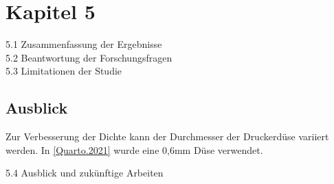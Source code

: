 \chapter{Kapitel 5}

5.1 Zusammenfassung der Ergebnisse\\
5.2 Beantwortung der Forschungsfragen\\
5.3 Limitationen der Studie\\

\section{Ausblick}

Zur Verbesserung der Dichte kann der Durchmesser der Druckerdüse variiert werden. In \autoref{Quarto.2021} wurde eine 0,6mm Düse verwendet.

5.4 Ausblick und zukünftige Arbeiten